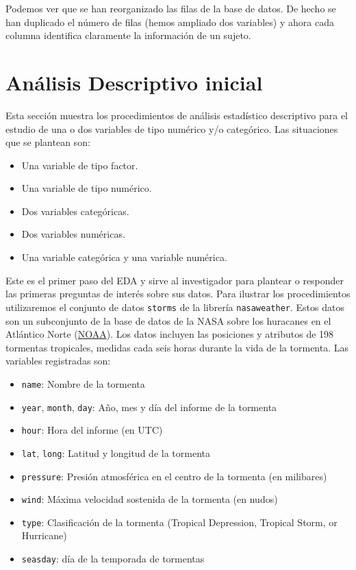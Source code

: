\documentclass[
]{book}
\providecommand{\tightlist}{%
  \setlength{\itemsep}{0pt}\setlength{\parskip}{0pt}}
\begin{document}
Podemos ver que se han reorganizado las filas de la base de datos. De hecho se han duplicado el número de filas (hemos ampliado dos variables) y ahora cada columna identifica claramente la información de un sujeto.

\hypertarget{anuxe1lisis-descriptivo-inicial}{%
\section{Análisis Descriptivo inicial}\label{anuxe1lisis-descriptivo-inicial}}

Esta sección muestra los procedimientos de análisis estadístico descriptivo para el estudio de una o dos variables de tipo numérico y/o categórico. Las situaciones que se plantean son:

\begin{itemize}
\tightlist
\item
  Una variable de tipo factor.
\item
  Una variable de tipo numérico.
\item
  Dos variables categóricas.
\item
  Dos variables numéricas.
\item
  Una variable categórica y una variable numérica.
\end{itemize}

Este es el primer paso del EDA y sirve al investigador para plantear o responder las primeras preguntas de interés sobre sus datos. Para ilustrar los procedimientos utilizaremos el conjunto de datos \texttt{storms} de la librería \texttt{nasaweather}. Estos datos son un subconjunto de la base de datos de la NASA sobre los huracanes en el Atlántico Norte (\href{http://www.nhc.noaa.gov/data/\#hurdat}{NOAA}). Los datos incluyen las posiciones y atributos de 198 tormentas tropicales, medidas cada seis horas durante la vida de la tormenta. Las variables registradas son:

\begin{itemize}
\tightlist
\item
  \texttt{name}: Nombre de la tormenta
\item
  \texttt{year}, \texttt{month}, \texttt{day}: Año, mes y día del informe de la tormenta
\item
  \texttt{hour}: Hora del informe (en UTC)
\item
  \texttt{lat}, \texttt{long}: Latitud y longitud de la tormenta
\item
  \texttt{pressure}: Presión atmosférica en el centro de la tormenta (en milibares)
\item
  \texttt{wind}: Máxima velocidad sostenida de la tormenta (en nudos)
\item
  \texttt{type}: Clasificación de la tormenta (Tropical Depression, Tropical Storm, or Hurricane)
\item
  \texttt{seasday}: día de la temporada de tormentas
\end{itemize}
\end{document}

